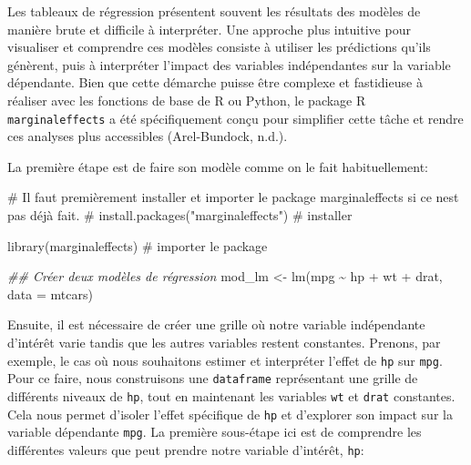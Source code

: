 \documentclass[
  letterpaper,
  DIV=11,
  numbers=noendperiod]{scrreprt}
\newenvironment{Shaded}{\begin{snugshade}}{\end{snugshade}}
\newcommand{\AttributeTok}[1]{\textcolor[rgb]{0.40,0.45,0.13}{#1}}
\newcommand{\CommentTok}[1]{\textcolor[rgb]{0.37,0.37,0.37}{#1}}
\newcommand{\DocumentationTok}[1]{\textcolor[rgb]{0.37,0.37,0.37}{\textit{#1}}}
\newcommand{\FunctionTok}[1]{\textcolor[rgb]{0.28,0.35,0.67}{#1}}
\newcommand{\NormalTok}[1]{\textcolor[rgb]{0.00,0.23,0.31}{#1}}
\newcommand{\OtherTok}[1]{\textcolor[rgb]{0.00,0.23,0.31}{#1}}
\newcommand{\SpecialCharTok}[1]{\textcolor[rgb]{0.37,0.37,0.37}{#1}}
\begin{document}
Les tableaux de régression présentent souvent les résultats des modèles
de manière brute et difficile à interpréter. Une approche plus intuitive
pour visualiser et comprendre ces modèles consiste à utiliser les
prédictions qu'ils génèrent, puis à interpréter l'impact des variables
indépendantes sur la variable dépendante. Bien que cette démarche puisse
être complexe et fastidieuse à réaliser avec les fonctions de base de R
ou Python, le package R \texttt{marginaleffects} a été spécifiquement
conçu pour simplifier cette tâche et rendre ces analyses plus
accessibles (Arel-Bundock, n.d.).

La première étape est de faire son modèle comme on le fait
habituellement:

\begin{Shaded}
\begin{Highlighting}[]
\CommentTok{\# Il faut premièrement installer et importer le package marginaleffects si ce n\textquotesingle{}est pas déjà fait.}
\CommentTok{\# install.packages("marginaleffects") \# installer}

\FunctionTok{library}\NormalTok{(marginaleffects) }\CommentTok{\# importer le package}

\DocumentationTok{\#\# Créer deux modèles de régression}
\NormalTok{mod\_lm }\OtherTok{\textless{}{-}} \FunctionTok{lm}\NormalTok{(mpg }\SpecialCharTok{\textasciitilde{}}\NormalTok{ hp }\SpecialCharTok{+}\NormalTok{ wt }\SpecialCharTok{+}\NormalTok{ drat, }\AttributeTok{data =}\NormalTok{ mtcars)}
\end{Highlighting}
\end{Shaded}

Ensuite, il est nécessaire de créer une grille où notre variable
indépendante d'intérêt varie tandis que les autres variables restent
constantes. Prenons, par exemple, le cas où nous souhaitons estimer et
interpréter l'effet de \texttt{hp} sur \texttt{mpg}. Pour ce faire, nous
construisons une \texttt{dataframe} représentant une grille de
différents niveaux de \texttt{hp}, tout en maintenant les variables
\texttt{wt} et \texttt{drat} constantes. Cela nous permet d'isoler
l'effet spécifique de \texttt{hp} et d'explorer son impact sur la
variable dépendante \texttt{mpg}. La première sous-étape ici est de
comprendre les différentes valeurs que peut prendre notre variable
d'intérêt, \texttt{hp}:

\begin{Shaded}
\end{Shaded}
\end{document}
